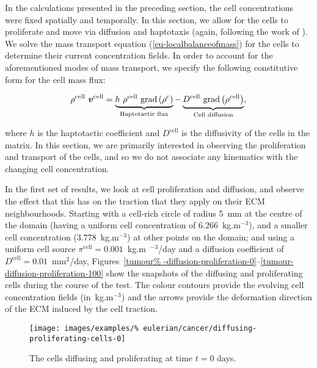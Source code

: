 In the calculations presented in the preceding section, the cell
concentrations were fixed spatially and temporally. In this section,
we allow for the cells to proliferate and move via diffusion and
haptotaxis (again, following the work of \citet{namyetal:04}). We
solve the mass transport equation (\ref{eu-localbalanceofmass}) for
the cells to determine their current concentration fields. In order to
account for the aforementioned modes of mass transport, we specify the
following constitutive form for the cell mass flux:

\begin{equation}
\rho^{\mathrm{cell}}\ \bv^{\mathrm{cell}} =
\underbrace{h\ \rho^{\mathrm{cell}}\ \mathrm{grad}
  \left(\rho^{\mathrm{c}}\right)}_{\text{Haptotactic flux}}
-\underbrace{D^{\mathrm{cell}}\ \mathrm{grad}
  \left(\rho^{\mathrm{cell}}\right) }_{\text{Cell diffusion}},
\end{equation}

\noindent where $h$ is the haptotactic coefficient and
$D^{\mathrm{cell}}$ is the diffusivity of the cells in the matrix. In
this section, we are primarily interested in observing the
proliferation and transport of the cells, and so we do not associate
any kinematics with the changing cell concentration.

In the first set of results, we look at cell proliferation and
diffusion, and observe the effect that this has on the traction that
they apply on their ECM neighbourhoods. Starting with a cell-rich
circle of radius 5~mm at the centre of the domain (having a uniform
cell concentration of 6.266~kg.m$^{-3}$), and a smaller cell
concentration (3.778~kg.m$^{-3}$) at other points on the domain; and
using a uniform cell source \mbox{$\pi^{\mathrm{cell}}=0.001$~kg.m%
  $^{-3}$/day} and a diffusion coefficient of \mbox{%
  $D^{\mathrm{cell}}=0.01$~mm$^2$/day,} Figures~\ref{tumour%
  -diffusion-proliferation-0}--\ref{tumour-diffusion-proliferation-100}
show the snapshots of the diffusing and proliferating cells during the
course of the test. The colour contours provide the evolving cell
concentration fields (in~kg.m$^{-3}$) and the arrows provide the
deformation direction of the ECM induced by the cell traction.

\clearpage

\begin{figure}[!hptb]
  \centering
  \texttt{[image: images/examples/\%
    eulerian/cancer/diffusing-proliferating-cells-0]}
  \caption{The cells diffusing and proliferating at time $t=0$ days.}
  \label{tumour-diffusion-proliferation-0}
\end{figure}

